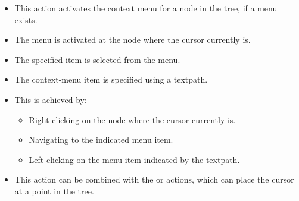 \begin{itemize}
\item This action activates the context menu for a node in the tree, if a menu exists.
\item The menu is activated at the node where the cursor currently is.
\item The specified item is  selected from the menu.
\item The context-menu item is specified using a textpath.
\item This is achieved by:
  \begin{itemize}
    \item Right-clicking on the node where the cursor currently is.
    \item Navigating to the indicated menu item.
    \item Left-clicking on the menu item indicated by the textpath.
  \end{itemize}
\item This action can be combined with the  or  actions, which can place the cursor at a point in the tree.
\end{itemize}
